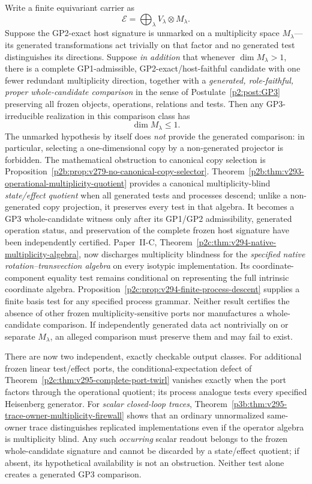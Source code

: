 \documentclass[11pt,a4paper]{article}
\begin{document}
\begin{proposition}
\label{p2:prop:gp3-multiplicity-bound}
Write a finite equivariant carrier as
\[
 \mathcal E=\bigoplus_\lambda V_\lambda\otimes M_\lambda.
\]
Suppose the GP2-exact host signature is unmarked on a multiplicity
space \(M_\lambda\)---its generated transformations act trivially on that
factor and no generated test distinguishes its directions.  Suppose
\emph{in addition} that whenever \(\dim M_\lambda>1\), there is a
complete GP1-admissible, GP2-exact/host-faithful candidate with one
fewer redundant multiplicity direction, together with a \emph{generated,
role-faithful, proper whole-candidate comparison} in the sense of
Postulate~\ref{p2:post:GP3} preserving all frozen objects, operations,
relations and tests.  Then any GP3-irreducible realization in this
comparison class has
\[
 \dim M_\lambda\le1.
\]
The unmarked hypothesis by itself does \emph{not} provide the generated
comparison: in particular, selecting a one-dimensional copy by a
non-generated projector is forbidden.  The mathematical obstruction to
canonical copy selection is Proposition~\ref{p2b:prop:v279-no-canonical-copy-selector}.
Theorem~\ref{p2b:thm:v293-operational-multiplicity-quotient}
provides a canonical multiplicity-blind \emph{state/effect quotient} when
all generated tests and processes descend; unlike a non-generated copy
projection, it preserves every test in that algebra.  It becomes a GP3
whole-candidate witness only after its GP1/GP2 admissibility, generated
operation status, and preservation of the complete frozen host signature
have been independently certified.
Paper~II-C, Theorem~\ref{p2c:thm:v294-native-multiplicity-algebra},
now discharges multiplicity blindness for the \emph{specified native
rotation--transvection algebra} on every isotypic implementation. Its
coordinate-component equality test remains conditional on representing
the full intrinsic coordinate algebra.
Proposition~\ref{p2c:prop:v294-finite-process-descent} supplies a finite
basis test for any specified process grammar. Neither result certifies
the absence of other frozen multiplicity-sensitive ports nor manufactures
a whole-candidate comparison.
If independently generated data act nontrivially on or separate
\(M_\lambda\), an alleged comparison must preserve them and may fail to
exist.

There are now two independent, exactly checkable output classes.  For
additional frozen linear test/effect ports, the conditional-expectation
defect of Theorem~\ref{p2c:thm:v295-complete-port-twirl} vanishes
exactly when the port factors through the operational quotient; its
process analogue tests every specified Heisenberg generator.  For
\emph{scalar closed-loop traces}, Theorem~\ref{p3b:thm:v295-trace-owner-multiplicity-firewall}
shows that an ordinary unnormalized same-owner trace distinguishes
replicated implementations even if the operator algebra is
multiplicity blind.  Any such \emph{occurring} scalar readout belongs to
the frozen whole-candidate signature and cannot be discarded by a
state/effect quotient; if absent, its hypothetical availability is not
an obstruction.  Neither test alone creates a generated GP3 comparison.
\end{proposition}
\end{document}
